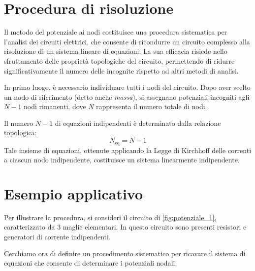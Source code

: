 \section{Procedura di risoluzione}

Il metodo del potenziale ai nodi costituisce una procedura sistematica per l'analisi dei circuiti elettrici, che consente di ricondurre un circuito complesso alla risoluzione di un sistema lineare di equazioni. La sua efficacia risiede nello sfruttamento delle proprietà topologiche del circuito, permettendo di ridurre significativamente il numero delle incognite rispetto ad altri metodi di analisi.

In primo luogo, è necessario individuare tutti i nodi del circuito. Dopo aver scelto un nodo di riferimento (detto anche \emph{massa}), si assegnano potenziali incogniti agli \(N-1\) nodi rimanenti, dove \(N\) rappresenta il numero totale di nodi.

Il numero \(N-1\) di equazioni indipendenti è determinato dalla relazione topologica:
\begin{equation}
    N_{\text{eq}} = N - 1
    \label{eq:nodi_indipendenti}
\end{equation}
Tale insieme di equazioni, ottenute applicando la Legge di Kirchhoff delle correnti a ciascun nodo indipendente, costituisce un sistema linearmente indipendente.

\begin{center}
\end{center}

\section*{Esempio applicativo}

Per illustrare la procedura, si consideri il circuito di \ref{fig:potenziale_1}, caratterizzato da 3 maglie elementari. In questo circuito sono presenti resistori e generatori di corrente indipendenti.


Cerchiamo ora di definire un procedimento sistematico per ricavare il sistema di equazioni che consente di determinare i potenziali nodali.

